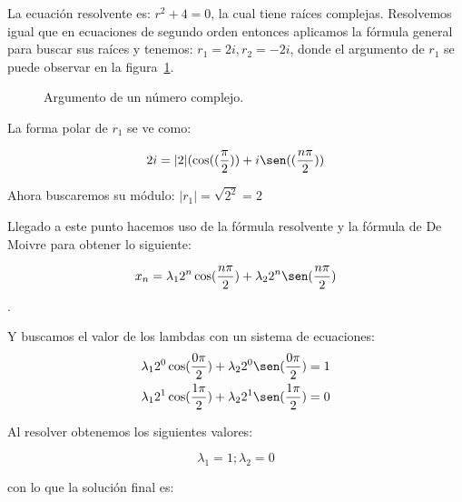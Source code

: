 \documentclass{report}
\theoremstyle{definition}
\begin{document}
La ecuación resolvente es: $r^2+4=0$, la cual tiene raíces complejas.
Resolvemos igual que en ecuaciones de segundo orden entonces aplicamos
la fórmula general para buscar sus raíces y tenemos: $r_1=2i,r_2=-2i$, donde el argumento de $r_1$ se puede observar en la figura~\ref{argum}.
\begin{figure}[htp]
\centering
{}
\caption{Argumento de un número complejo.}
\label{argum}
\end{figure}

La forma polar de $r_1$ se ve como:


$$2i=|2|(\cos((\frac{\pi}{2}))+i\sen((\frac{n\pi}{2}))$$

Ahora buscaremos su módulo: $|r_{1}|=\sqrt{2^2}=2$

Llegado a este punto hacemos uso de la fórmula resolvente y la fórmula de De Moivre para obtener lo siguiente:

$$x_n=\lambda_12^n\cos(\frac{n\pi}{2})+\lambda_22^n\sen(\frac{n\pi}{2})$$.

Y buscamos el valor de los lambdas con un sistema de ecuaciones:
\begin{align*}
  \lambda_12^0\cos(\frac{0\pi}{2})+\lambda_22^0\sen(\frac{0\pi}{2})&=1\\
\lambda_12^1\cos(\frac{1\pi}{2})+\lambda_22^1\sen(\frac{1\pi}{2})&=0
\end{align*}

Al resolver obtenemos los siguientes valores:

$$\lambda_1=1;\lambda_2=0$$

con lo que la solución final es:
\end{document}
